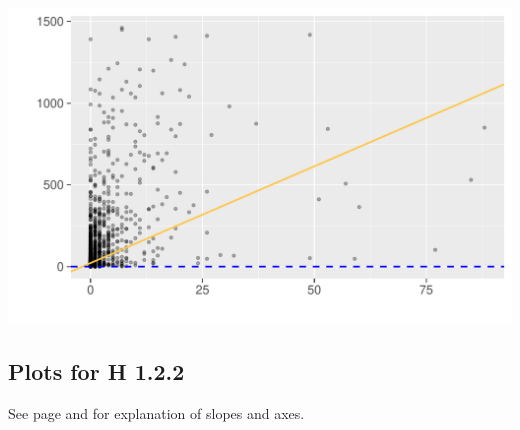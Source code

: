 \begin{minipage}{.5\textwidth}
	\centering
	\includegraphics[page=1,scale=0.3]{../hypotheses/lm_issues_model_13_14.pdf}
  \label{fig:hyp1_issue_model_13-14}
\end{minipage}


\subsection{Plots for H 1.2.2}
\label{sec:h_1.2.2_plots}

See page \pageref{sec:lm_plots_description} and \pageref{sec:h1.2.2_models} for explanation of slopes and axes.
\vspace{20 pt}

